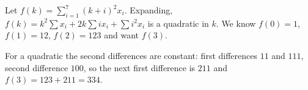 Let $f(k)=\sum_{i=1}^7(k+i)^2x_i$. Expanding, $f(k)=k^2\sum x_i+2k\sum ix_i+\sum i^2x_i$ is a quadratic in $k$. We know $f(0)=1$, $f(1)=12$, $f(2)=123$ and want $f(3)$.

For a quadratic the second differences are constant: first differences $11$ and $111$, second difference $100$, so the next first difference is $211$ and $f(3)=123+211=\boxed{334}$.
